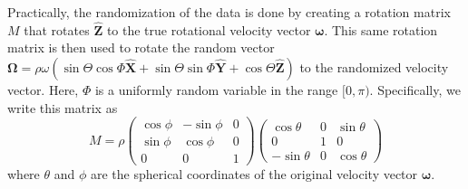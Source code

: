\documentclass{aastex631}
\newcommand{\unit}[1]{\hat{\mathbf{#1}}}
\newcommand{\parens}[1]{\left( #1 \right)}
\begin{document}
Practically, the randomization of the data is done by creating a rotation matrix $M$ that rotates $\unit Z$ to the true rotational velocity vector $\mathbf \omega$. This same rotation matrix is then used to rotate the random vector $\mathbf \Omega = \rho \omega (\sin \Theta \cos\Phi \unit X + \sin \Theta \sin \Phi\unit Y + \cos \Theta\unit Z)$ to the randomized velocity vector. Here, $\Phi$ is a uniformly random variable in the range $[0, \pi)$. Specifically, we write this matrix as
\begin{equation}
M = \rho\parens{\begin{array}{ccc}
\cos \phi & -\sin \phi & 0\\
\sin \phi & \cos \phi & 0\\
0 & 0 & 1
\end{array}}
\parens{\begin{array}{ccc}
\cos \theta & 0 & \sin \theta \\
0 & 1 & 0\\
-\sin \theta & 0 & \cos \theta
\end{array}}
\label{eqn:rotate-uncertainty-matrix}
\end{equation}
where $\theta$ and $\phi$ are the spherical coordinates of the original velocity vector $\mathbf \omega.$
\end{document}
